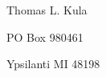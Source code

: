 \documentclass[12pt]{article}
\begin{document}
\newpage

\thispagestyle{empty}
\vspace*{14cm}
\begin{sideways}
\Large{Thomas L. Kula}
\end{sideways}
\begin{sideways}
\Large{PO Box 980461}
\end{sideways}
\begin{sideways}
\Large{Ypsilanti MI 48198}
\end{sideways}
\end{document}
